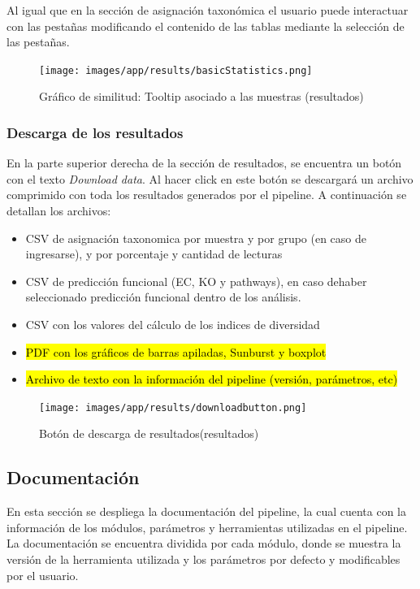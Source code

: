 \begin{itemize}
Al igual que en la sección de asignación taxonómica el usuario puede interactuar con las pestañas modificando el contenido de las tablas mediante la selección de las pestañas.


\begin{figure}[H]
    \texttt{[image: images/app/results/basicStatistics.png]}

    \caption{Gráfico de similitud: Tooltip asociado a las muestras (resultados)}
    \label{fig:app-results-functional}
\end{figure}
\subsubsection{Descarga de los resultados}
En la parte superior derecha de la sección de resultados, se encuentra un botón con el texto \textit{Download data}. 
Al hacer click en este botón se descargará un archivo comprimido con toda los resultados generados por el pipeline.
A continuación se detallan los archivos:
\begin{itemize}
    \item CSV de asignación taxonomica por muestra y por grupo (en caso de ingresarse), y por porcentaje y cantidad de lecturas
    \item CSV de predicción funcional (EC, KO y pathways), en caso dehaber seleccionado predicción funcional dentro de los análisis.
    \item CSV con los valores del cálculo de los indices de diversidad
    \item \hl{PDF con los gráficos de barras apiladas, Sunburst y boxplot}
    \item \hl{Archivo de texto con la información del pipeline (versión, parámetros, etc)}
\end{itemize}

\begin{figure}[H]
    \texttt{[image: images/app/results/downloadbutton.png]}

    \caption{Botón de descarga de resultados(resultados)}
    \label{fig:app-results-download}
\end{figure}
\subsection{Documentación}
En esta sección se despliega la documentación del pipeline, la cual cuenta con la información de los módulos, parámetros y herramientas utilizadas en el pipeline. La documentación se encuentra dividida por cada módulo, donde se muestra la versión de la herramienta utilizada y los parámetros por defecto y modificables por el usuario.

\end{itemize}
